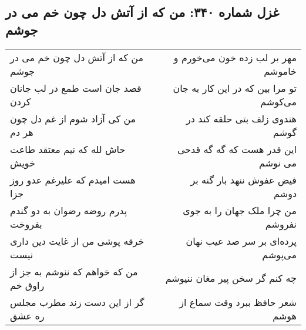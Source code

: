 \begin{center}
\section*{غزل شماره ۳۴۰: من که از آتش دل چون خم می در جوشم}
\label{sec:sh340}
\begin{longtable}{l p{0.5cm} r}
من که از آتش دل چون خم می در جوشم
&&
مهر بر لب زده خون می‌خورم و خاموشم
\\
قصد جان است طمع در لب جانان کردن
&&
تو مرا بین که در این کار به جان می‌کوشم
\\
من کی آزاد شوم از غم دل چون هر دم
&&
هندوی زلف بتی حلقه کند در گوشم
\\
حاش لله که نیم معتقد طاعت خویش
&&
این قدر هست که گه گه قدحی می نوشم
\\
هست امیدم که علیرغم عدو روز جزا
&&
فیض عفوش ننهد بار گنه بر دوشم
\\
پدرم روضه رضوان به دو گندم بفروخت
&&
من چرا ملک جهان را به جوی نفروشم
\\
خرقه پوشی من از غایت دین داری نیست
&&
پرده‌ای بر سر صد عیب نهان می‌پوشم
\\
من که خواهم که ننوشم به جز از راوق خم
&&
چه کنم گر سخن پیر مغان ننیوشم
\\
گر از این دست زند مطرب مجلس ره عشق
&&
شعر حافظ ببرد وقت سماع از هوشم
\\
\end{longtable}
\end{center}
